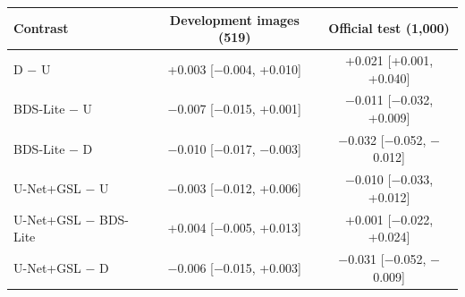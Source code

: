 \begin{tabular}{lcc}
\toprule
Contrast & Development images (519) & Official test (1,000) \\
\midrule
D $-$ U & +0.003 [$-$0.004, +0.010] & +0.021 [+0.001, +0.040] \\
BDS-Lite $-$ U & $-$0.007 [$-$0.015, +0.001] & $-$0.011 [$-$0.032, +0.009] \\
BDS-Lite $-$ D & $-$0.010 [$-$0.017, $-$0.003] & $-$0.032 [$-$0.052, $-$0.012] \\
U-Net+GSL $-$ U & $-$0.003 [$-$0.012, +0.006] & $-$0.010 [$-$0.033, +0.012] \\
U-Net+GSL $-$ BDS-Lite & +0.004 [$-$0.005, +0.013] & +0.001 [$-$0.022, +0.024] \\
U-Net+GSL $-$ D & $-$0.006 [$-$0.015, +0.003] & $-$0.031 [$-$0.052, $-$0.009] \\
\bottomrule
\end{tabular}
